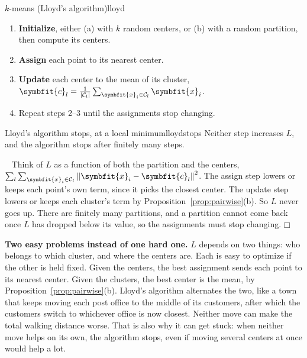 \documentclass[11pt]{article}
\newcommand{\bm}[1]{\symbfit{#1}}
\newenvironment{proofsketch}{\par\noindent{\itshape Proof.}\ }{\hfill$\mdlgwhtsquare$\par}
\newcommand{\vx}{\bm{x}}
\newcommand{\norm}[1]{\left\lVert #1\right\rVert}
\begin{document}
\begin{algorithm}{$k$-means (Lloyd's algorithm)}{lloyd}
\begin{enumerate}[nosep,label=\arabic*)]
\item \textbf{Initialize}, either (a) with $k$ random centers, or (b) with a random partition, then compute its centers.
\item \textbf{Assign} each point to its nearest center.
\item \textbf{Update} each center to the mean of its cluster, $\bm c_l=\frac1{|\mathcal C_l|}\sum_{\vx_i\in\mathcal C_l}\vx_i$.
\item Repeat steps 2--3 until the assignments stop changing.
\end{enumerate}
\end{algorithm}

\begin{proposition}{Lloyd's algorithm stops, at a local minimum}{lloydstops}
Neither step increases $L$, and the algorithm stops after finitely many steps.
\end{proposition}
\begin{proofsketch}
Think of $L$ as a function of both the partition and the centers, $\sum_l\sum_{\vx_i\in\mathcal C_l}\norm{\vx_i-\bm c_l}^2$. The assign step lowers or keeps each point's own term, since it picks the closest center. The update step lowers or keeps each cluster's term by Proposition~\ref{prop:pairwise}(b). So $L$ never goes up. There are finitely many partitions, and a partition cannot come back once $L$ has dropped below its value, so the assignments must stop changing.
\end{proofsketch}

\begin{intuition}
\textbf{Two easy problems instead of one hard one.} $L$ depends on two things: who belongs to which cluster, and where the centers are. Each is easy to optimize if the other is held fixed. Given the centers, the best assignment sends each point to its nearest center. Given the clusters, the best center is the mean, by Proposition~\ref{prop:pairwise}(b). Lloyd's algorithm alternates the two, like a town that keeps moving each post office to the middle of its customers, after which the customers switch to whichever office is now closest. Neither move can make the total walking distance worse. That is also why it can get stuck: when neither move helps on its own, the algorithm stops, even if moving several centers at once would help a lot.
\end{intuition}
\end{document}
